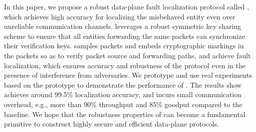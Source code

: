 In this paper, we %
propose a robust data-plane fault localization protocol called \name{}, which achieves high accuracy for localizing the misbehaved entity even over unreliable communication channels. %
\name{} leverages a robust symmetric key sharing scheme to ensure that all entities forwarding the same packets can synchronize their verification keys. 
\name{} samples packets and embeds cryptographic markings in the packets so as to verify packet source and forwarding paths, and achieve fault localization, which ensures accuracy and robustness of the protocol even in the presence of interference from adversaries. We prototype \name{} and use real experiments based on the prototype to demonstrate the performance of \name{}. The results show \name{} achieves around 99.5\% localization accuracy, and incurs small communication overhead, e.g., more than 90\% throughput and 85\% goodput compared to the baseline. %
We hope that the robustness properties of \name{} can become a fundamental primitive to construct highly secure and efficient data-plane protocols. 